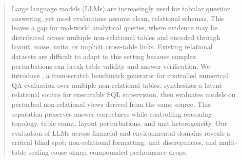 \begin{abstract}



Large language models (LLMs) are increasingly used for tabular question answering, yet most evaluations assume clean, relational schemas. This leaves a gap for real-world analytical queries, where evidence may be distributed across multiple non-relational tables and encoded through layout, noise, units, or implicit cross-table links. Existing relational datasets are difficult to adapt to this setting because complex perturbations can break table validity and answer verification. 
We introduce \name, a from-scratch benchmark generator for controlled numerical QA evaluation over multiple non-relational tables. \name synthesizes a latent relational source for executable SQL supervision, then evaluates models on perturbed non-relational views derived from the same source. This separation preserves answer correctness while controlling reasoning topology, table count, layout perturbations, and unit heterogeneity. Our evaluation of LLMs across financial and environmental domains reveals a critical blind spot: non-relational formatting, unit discrepancies, and multi-table scaling cause sharp, compounded performance drops.
\end{abstract}